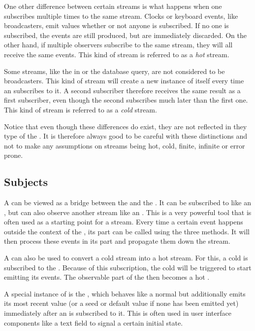 One other difference between certain streams is what happens when one subscribes multiple times to the same stream. Clocks or keyboard events, like broadcasters, emit values whether or not anyone is subscribed. If no one is subscribed, the events are still produced, but are immediately discarded. On the other hand, if multiple observers subscribe to the same stream, they will all receive the same events. This kind of stream is referred to as a \textit{hot} stream.

Some streams, like the  in  or the database query, are not considered to be broadcasters. This kind of stream will create a new instance of itself every time an \obv subscribes to it. A second subscriber therefore receives the same result as a first subscriber, even though the second subscribes much later than the first one. This kind of stream is referred to as a \textit{cold} stream.

Notice that even though these differences do exist, they are not reflected in they type of the \obs. It is therefore always good to be careful with these distinctions and not to make any assumptions on streams being hot, cold, finite, infinite or error prone.

\subsection{Subjects}
\label{subsec:subjects}
A \subj can be viewed as a bridge between the \obv and the \obs. It can be subscribed to like an \obs, but can also observe another stream like an \obv. This is a very powerful tool that is often used as a starting point for a stream. Every time a certain event happens outside the context of the \subj, its \obv part can be called using the three methods. It will then process these events in its \obs part and propagate them down the stream.

A \subj can also be used to convert a cold stream into a hot stream. For this, a cold \obs is subscribed to the \subj. Because of this subscription, the cold \obs will be triggered to start emitting its events. The observable part of the \subj then becomes a hot \obs.

A special instance of \subj is the \bsubj, which behaves like a normal \subj but additionally emits its most recent value (or a seed or default value if none has been emitted yet) immediately after an \obv is subscribed to it. This is often used in user interface components like a text field to signal a certain initial state.

